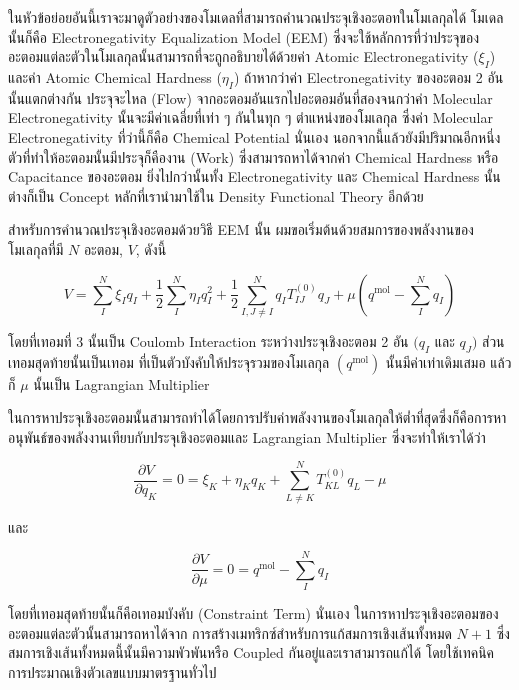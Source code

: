 ในหัวข้อย่อยอันนี้เราจะมาดูตัวอย่างของโมเดลที่สามารถคำนวณประจุเชิงอะตอทในโมเลกุลได้ โมเดลนั้นก็คือ Electronegativity Equalization 
Model (EEM) ซึ่งจะใช้หลักการที่ว่าประจุของอะตอมแต่ละตัวในโมเลกุลนั้นสามารถที่จะถูกอธิบายได้ด้วยค่า Atomic Electronegativity ($\xi_{I}$) 
และค่า Atomic Chemical Hardness ($\eta_{I}$) ถ้าหากว่าค่า Electronegativity ของอะตอม 2 อันนั้นแตกต่างกัน ประจุจะไหล (Flow) 
จากอะตอมอันแรกไปอะตอมอันที่สองจนกว่าค่า Molecular Electronegativity นั้นจะมีค่าเฉลี่ยที่เท่า ๆ กันในทุก ๆ ตำแหน่งของโมเลกุล%
\autocite{mortier1986,ionescu2013} ซึ่งค่า Molecular Electronegativity ที่ว่านี้ก็คือ Chemical Potential นั่นเอง 
นอกจากนี้แล้วยังมีปริมาณอีกหนึ่งตัวที่ทำให้อะตอมนั้นมีประจุก็คืองาน (Work) ซึ่งสามารถหาได้จากค่า Chemical Hardness หรือ Capacitance 
ของอะตอม ยิ่งไปกว่านั้นทั้ง Electronegativity และ Chemical Hardness นั้นต่างก็เป็น Concept หลักที่เรานำมาใช้ใน Density Functional 
Theory อีกด้วย\autocite{parr1994a,yang1998}

สำหรับการคำนวณประจุเชิงอะตอมด้วยวิธี EEM นั้น ผมขอเริ่มต้นด้วยสมการของพลังงานของโมเลกุลที่มี $N$ อะตอม, $V$, ดังนี้

\begin{equation}
    V 
    = 
    \sum_I^N \xi_I q_I+\frac{1}{2} 
    \sum_I^N \eta_I q_I^2+\frac{1}{2} 
    \sum_{I, J \neq I}^N q_I T_{I J}^{(0)} q_J 
    + \mu\left(q^{\mathrm{mol}}-\sum_I^N q_I\right)
\end{equation}

\noindent โดยที่เทอมที่ 3 นั้นเป็น Coulomb Interaction ระหว่างประจุเชิงอะตอม 2 อัน $(q_I$ และ $q_J)$ ส่วนเทอมสุดท้ายนั้นเป็นเทอม%
ที่เป็นตัวบังคับให้ประจุรวมของโมเลกุล $(q^{\mathrm{mol}})$ นั้นมีค่าเท่าเดิมเสมอ แล้วก็ $\mu$ นั้นเป็น Lagrangian Multiplier 

ในการหาประจุเชิงอะตอมนั้นสามารถทำได้โดยการปรับค่าพลังงานของโมเลกุลให้ต่ำที่สุดซึ่งก็คือการหาอนุพันธ์ของพลังงานเทียบกับประจุเชิงอะตอมและ 
Lagrangian Multiplier ซึ่งจะทำให้เราได้ว่า

\begin{equation}
    \frac{\partial V}{\partial q_K} 
    = 
    0 
    = \xi_K+\eta_K q_K+\sum_{L \neq K}^N T_{K L}^{(0)} q_L-\mu
\end{equation}

\noindent และ 

\begin{equation}
    \frac{\partial V}{\partial \mu}
    = 
    0 
    = 
    q^{\mathrm{mol}}-\sum_I^N q_I
\end{equation}

\noindent โดยที่เทอมสุดท้ายนั้นก็คือเทอมบังคับ (Constraint Term) นั่นเอง ในการหาประจุเชิงอะตอมของอะตอมแต่ละตัวนั้นสามารถหาได้จาก%
การสร้างเมทริกซ์สำหรับการแก้สมการเชิงเส้นทั้งหมด $N+1$ ซึ่งสมการเชิงเส้นทั้งหมดนี้นั้นมีความพัวพันหรือ Coupled กันอยู่และเราสามารถแก้ได้%
โดยใช้เทคนิคการประมาณเชิงตัวเลขแบบมาตรฐานทั่วไป 

